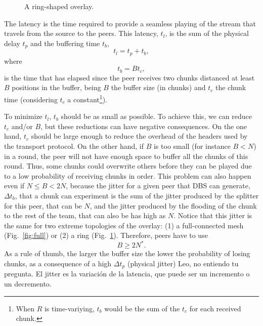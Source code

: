 

\label{sec:latency}

\begin{figure}
  \centering
  \vbox{}
  \caption{A ring-shaped overlay.}
  \label{fig:ring}
\end{figure}

The latency is the time required to provide a seamless playing of
the stream that travels from the source to the peers. This latency,
$t_l$, is the sum of the physical delay $t_p$ and the buffering time
$t_b$,
\begin{equation}
  \label{eq:t_l}
  t_l = t_p + t_b,
\end{equation}
where
\begin{equation}
  \label{eq:t_b}
  t_b = Bt_c,
\end{equation}
is the time that has elapsed since the peer receives two chunks
distanced at least $B$ positions in the buffer, being $B$ the buffer
size (in chunks) and $t_c$ the chunk time (considering $t_c$ a
constant\footnote{When $R$ is time-variying, $t_b$ would be the sum of
  the $t_c$ for each received chunk.}).

To minimize $t_l$, $t_b$ should be as small as possible. To achieve
this, we can reduce $t_c$ and/or $B$, but these reductions can have
negative consequences. On the one hand, $t_c$ should be large enough
to reduce the overhead of the headers used by the transport
protocol. On the other hand, if $B$ is too small (for instance $B<N$)
in a round, the peer will not have enough space to buffer all the
chunks of this round. Thus, some chunks could overwrite others before
they can be played due to a low probability of receiving chunks in
order. This problem can also happen even if $N\leq B<2N$, because the
jitter for a given peer that DBS can generate, $\Delta t_b$, that a
chunk can experiment is the sum of the jitter produced by the splitter
for this peer, that can be $N$, and the jitter produced by the
flooding of the chunk to the rest of the team, that can also be has
high as $N$. Notice that this jitter is the same for two extreme
topologies of the overlay: (1) a full-connected mesh
(Fig.~\ref{fig:full}) or (2) a ring
(Fig.~\ref{fig:ring}). Therefore, peers have to use
\begin{equation}
  \label{eq:minimum_B}
  B\ge 2N^*.
\end{equation}
As a rule of thumb, the larger the buffer size the lower the
probability of losing chunks, as a consequence of a high $\Delta t_p$
(physical jitter)  {\color{red}
  Leo, no entiendo tu pregunta. El jitter es la variación de la
  latencia, que puede ser un incremento o un decremento}.

